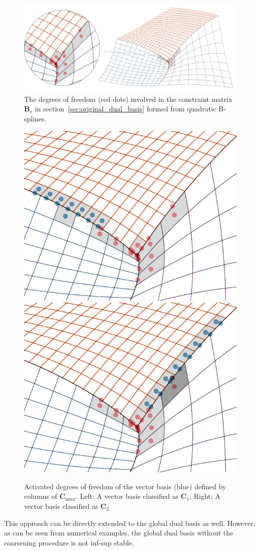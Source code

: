 \begin{figure}[ht]
  \centering
  \includegraphics[width=\linewidth]{mesh_spy}
  \caption{The degrees of freedom (red dots) involved in the constraint matrix $\mathbf{B}_v$ in section~\ref{sec:original_dual_basis} formed from quadratic B-splines.}\label{fig:cross_point_dof}
\end{figure}

\begin{figure}[ht]
  \centering
  \includegraphics[width=.47\linewidth]{trim_nonoverlap}\qquad
  \includegraphics[width=.47\linewidth]{trim_overlap}
  \caption{Activated degrees of freedom of the vector basis (blue) defined by columns of $\mathbf{C}_\text{inter}$. Left: A vector basis classified as $\mathbf{C}_1$; Right: A vector basis classified as $\mathbf{C}_2$}\label{fig:overlap_nonoverlap}
\end{figure}

\begin{remark}
  This approach can be directly extended to the global dual basis as well. However, as can be seen from numerical examples, the global dual basis without the coarsening procedure is not inf-sup stable.
\end{remark}


